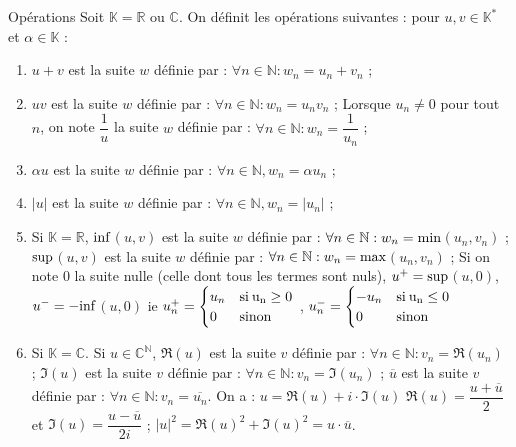 \documentclass[12pt,a4paper]{report}
\begin{document}
\begin{definition}{Opérations}{}
Soit $\mathbb{K} = \mathbb{R}$ ou $\mathbb{C}$. On définit les opérations suivantes : pour $u,v \in \mathbb{K}^*$ et $\alpha \in \mathbb{K}$ : 
\begin{enumerate}
\item $u+v$ est la suite $w$ définie par : $\forall n \in \mathbb{N} : w_n = u_n + v_n$ ;
\item $uv$ est la suite $w$ définie par : $\forall n \in \mathbb{N} : w_n = u_nv_n$ ;
\newline Lorsque $u_n \neq 0$ pour tout $n$, on note $\dfrac{1}{u}$ la suite $w$ définie par : $\forall n \in \mathbb{N} : w_n = \dfrac{1}{u_n}$ ;
\item $\alpha u$ est la suite $w$ définie par : $\forall n \in \mathbb{N}, w_n = \alpha u_n$ ;
\item $\lvert u \rvert$ est la suite $w$ définie par : $\forall n \in \mathbb{N}, w_n = \lvert u_n \rvert$ ;
\item Si $\mathbb{K} = \mathbb{R}$, $\rm{inf}$$(u,v)$ est la suite $w$ définie par : $\forall n \in \mathbb{N} : w_n = \rm{min}$$(u_n,v_n)$ ;
\newline $\rm{sup}$$(u,v)$ est la suite $w$ définie par : $\forall n \in \mathbb{N} : w_n = \rm{max}$$(u_n,v_n)$ ; 
\newline Si on note $0$ la suite nulle (celle dont tous les termes sont nuls), $u^+ = \rm{sup}$$(u,0)$, $u^- = -\rm{inf}$$(u,0)$
\newline ie $u^+_n = 
\begin{cases}
u_n &\rm{si } \: u_n \geq 0 \\
0 & \rm{sinon}
\end{cases}$
, $u^-_n = 
\begin{cases}
-u_n &\rm{si } \: u_n \leq 0 \\
0 & \rm{sinon}
\end{cases}$

\item Si $\mathbb{K} = \mathbb{C}$. Si $u \in \mathbb{C}^\mathbb{N}$,
\newline $\Re(u)$ est la suite $v$ définie par : $\forall n \in \mathbb{N} : v_n = \Re(u_n)$ ;
\newline $\Im(u)$ est la suite $v$ définie par : $\forall n \in \mathbb{N} : v_n = \Im(u_n)$ ;
\newline $\overline{u}$ est la suite $v$ définie par : $\forall n \in \mathbb{N} : v_n = \overline{u_n}$.
\newline On a : 
\newline $u = \Re(u) + i\cdot  \Im(u)$
\newline $\Re(u) = \dfrac{u+ \overline{u}}{2}$ et $\Im(u) = \dfrac{u - \overline{u}}{2i}$ ;
\newline $\lvert u \rvert ^2 = \Re(u)^2 + \Im(u)^2 = u\cdot\overline{u}$.

\end{enumerate}
\end{definition}
\end{document}
